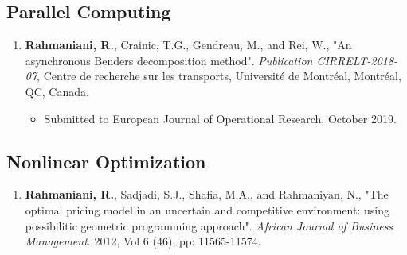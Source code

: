 \documentclass[10PT,letter]{article}
\newcommand{\subsectionstyle}[1]{\normalfont\selectfont\textcolor{titlecol}{\sffamily #1}}
\begin{document}
		\subsection*{\subsectionstyle{Parallel Computing}}
				\begin{enumerate}[itemsep=.5mm]
					\item 
								\textbf{Rahmaniani, R.}, Crainic, T.G., Gendreau, M., and Rei, W., "An asynchronous Benders decomposition method". \textit{Publication CIRRELT-2018-07}, Centre de recherche sur les transports, Universit\'e de Montr\'eal, Montr\'eal, QC, Canada. 
								\begin{itemize}
									\item Submitted to European Journal of Operational Research, October 2019.
								\end{itemize}
				\end{enumerate}
		\subsection*{\subsectionstyle{Nonlinear Optimization}}
		\begin{enumerate}[itemsep=.5mm]
			\item 
					\textbf{Rahmaniani, R.}, Sadjadi, S.J.,    Shafia, M.A., and Rahmaniyan, N., "The optimal pricing model in an uncertain and competitive environment: using possibilitic geometric programming approach". \textit{African Journal of Business Management}. 2012, Vol 6 (46), pp: 11565-11574.
		\end{enumerate}
	
	
\end{document}
